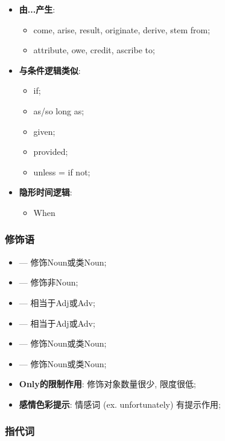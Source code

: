 \begin{multicols}{3}
\begin{itemize}
      \item \textbf{由...产生}:
      \begin{itemize}
        \item come, arise, result, originate, derive, stem from;
        \item attribute, owe, credit, ascribe to;
      \end{itemize}

      \item \textbf{与条件逻辑类似}:
      \begin{itemize}
        \item if;
        \item as/so long as;
        \item given;
        \item provided;
        \item unless = if not;
      \end{itemize}

      \item \textbf{隐形时间逻辑}:
      \begin{itemize}
        \item When
      \end{itemize}
    \end{itemize}
  \end{multicols}

\subsubsection{修饰语}

  \begin{itemize}
    \item {} — 修饰Noun或类Noun;
    \item {} — 修饰非Noun;
    \item {} — 相当于Adj或Adv;
    \item {} — 相当于Adj或Adv;
    \item {} — 修饰Noun或类Noun;
    \item {} — 修饰Noun或类Noun;
    \item \textbf{Only的限制作用}: 修饰对象数量很少, 限度很低;
    \item \textbf{感情色彩提示}: 情感词 (ex. unfortunately) 有提示作用;
  \end{itemize}

\subsubsection{指代词}

